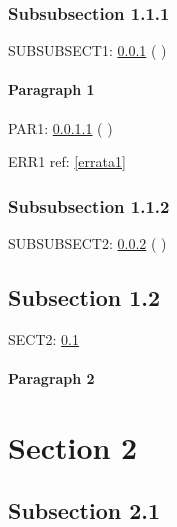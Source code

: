 \documentclass[a4paper,12pt]{report}
\makeatletter
\newcommand{\getCurrentSectionNumber}{%
  \ifnum\c@section=0 %
  \thechapter
  \else
  \ifnum\c@subsection=0 %
  \thesection
  \else
  \ifnum\c@subsubsection=0 %
  \thesubsection
  \else
  \thesubsubsection
  \fi
  \fi
  \fi
}
\makeatother
\begin{document}
\subsubsection{Subsubsection 1.1.1}\label{subsubsect-one}


SUBSUBSECT1: \cref{subsubsect-one} (\getCurrentSectionNumber)

\paragraph{Paragraph 1}\label{par-one}


PAR1: \cref{par-one}  (\getCurrentSectionNumber)


ERR1 ref: \ref{errata1}


\subsubsection{Subsubsection 1.1.2}\label{subsubsect-two}


SUBSUBSECT2: \cref{subsubsect-two} (\getCurrentSectionNumber)


\subsection{Subsection 1.2}\label{subsect-two}

SECT2: \cref{subsect-two}




\paragraph*{Paragraph 2}\label{par-two}




\section{Section 2}\label{sect-two}

\subsection{Subsection 2.1}\label{subsect-two-one}
\end{document}

